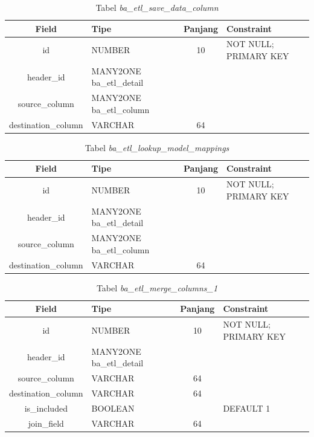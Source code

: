 \begin{table}[H]
	\centering
		\caption{Tabel \textit{ba\_etl\_save\_data\_column}}
		\begin{tabular}{ | c | p{4cm} | c | p{4cm} |}
			\hline
				Field & Tipe & Panjang & Constraint \\ \hline \hline
			id & NUMBER & 10 & NOT NULL; PRIMARY KEY  \\ \hline
			header\_id & MANY2ONE ba\_etl\_detail & & \\ \hline 
			source\_column & MANY2ONE ba\_etl\_column & &  \\ \hline 
			destination\_column & VARCHAR & 64  &  \\ \hline  
		\end{tabular}
\end{table}

\begin{table}[H]
	\centering
		\caption{Tabel \textit{ba\_etl\_lookup\_model\_mappings}}
		\begin{tabular}{ | c | p{4cm} | c | p{4cm} |}
			\hline
				Field & Tipe & Panjang & Constraint \\ \hline \hline
			id & NUMBER & 10 & NOT NULL; PRIMARY KEY  \\ \hline
			header\_id & MANY2ONE ba\_etl\_detail & & \\ \hline 
			source\_column & MANY2ONE ba\_etl\_column & &  \\ \hline 
			destination\_column & VARCHAR & 64  &  \\ \hline  
		\end{tabular}
\end{table}

\begin{table}[H]
	\centering
		\caption{Tabel \textit{ba\_etl\_merge\_columns\_1}}
		\begin{tabular}{ | c | p{4cm} | c | p{4cm} |}
			\hline
				Field & Tipe & Panjang & Constraint \\ \hline \hline
			id & NUMBER & 10 & NOT NULL; PRIMARY KEY  \\ \hline
			header\_id & MANY2ONE ba\_etl\_detail & & \\ \hline 
			source\_column & VARCHAR & 64 &  \\ \hline 
			destination\_column & VARCHAR & 64  &  \\ \hline
			is\_included & BOOLEAN &  & DEFAULT 1 \\ \hline
			join\_field & VARCHAR & 64  &  \\ \hline
		\end{tabular}
\end{table}


